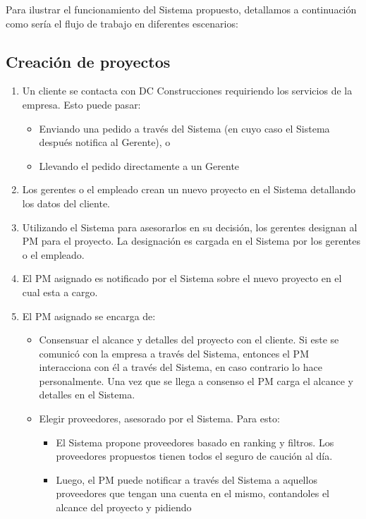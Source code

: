 Para ilustrar el funcionamiento del Sistema propuesto, detallamos a continuación como sería el flujo de trabajo en diferentes escenarios:

\subsection{Creación de proyectos}

\begin{enumerate}
    \item Un cliente se contacta con DC Construcciones requiriendo los servicios de la empresa. Esto puede pasar:
        \begin{itemize}
            \item Enviando una pedido a través del Sistema (en cuyo caso el Sistema después notifica al Gerente), o
            \item Llevando el pedido directamente a un Gerente
        \end{itemize}
    \item Los gerentes o el empleado crean un nuevo proyecto en el Sistema detallando los datos del cliente.
    \item Utilizando el Sistema para asesorarlos en su decisión, los gerentes designan al PM para el proyecto.
        La designación es cargada en el Sistema por los gerentes o el empleado.
    \item El PM asignado es notificado por el Sistema sobre el nuevo proyecto en el cual esta a cargo.
    \item El PM asignado se encarga de:
        \begin{itemize}
            \item Consensuar el alcance y detalles del proyecto con el cliente. Si este se comunicó con la empresa a través del Sistema, entonces el PM interacciona con él a través del Sistema, en caso contrario lo hace personalmente. Una vez que se llega a consenso el PM carga el alcance y detalles en el Sistema.
            \item Elegir proveedores, asesorado por el Sistema. Para esto:
                \begin{itemize}
                    \item El Sistema propone proveedores basado en ranking y filtros. Los proveedores propuestos tienen todos el seguro de caución al día.
                    \item Luego, el PM puede notificar a través del Sistema a aquellos proveedores que tengan una cuenta en el mismo, contandoles el alcance del proyecto y pidiendo

\end{itemize}
\end{itemize}
\end{enumerate}
